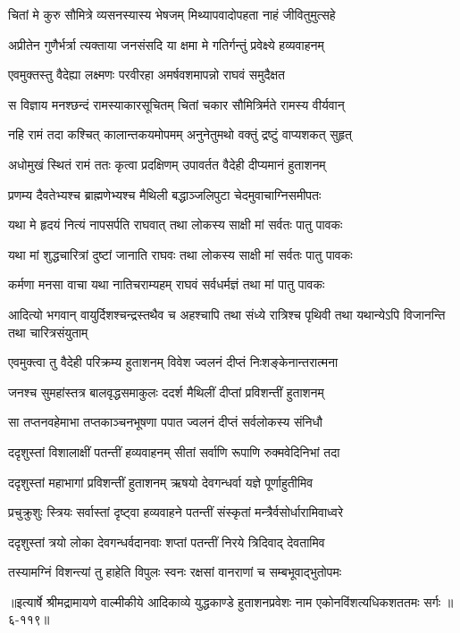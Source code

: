 \twolineshloka
{चितां मे कुरु सौमित्रे व्यसनस्यास्य भेषजम्}
{मिथ्यापवादोपहता नाहं जीवितुमुत्सहे} %

\twolineshloka
{अप्रीतेन गुणैर्भर्त्रा त्यक्ताया जनसंसदि}
{या क्षमा मे गतिर्गन्तुं प्रवेक्ष्ये हव्यवाहनम्} %

\twolineshloka
{एवमुक्तस्तु वैदेह्या लक्ष्मणः परवीरहा}
{अमर्षवशमापन्नो राघवं समुदैक्षत} %

\twolineshloka
{स विज्ञाय मनश्छन्दं रामस्याकारसूचितम्}
{चितां चकार सौमित्रिर्मते रामस्य वीर्यवान्} %

\twolineshloka
{नहि रामं तदा कश्चित् कालान्तकयमोपमम्}
{अनुनेतुमथो वक्तुं द्रष्टुं वाप्यशकत् सुहृत्} %

\twolineshloka
{अधोमुखं स्थितं रामं ततः कृत्वा प्रदक्षिणम्}
{उपावर्तत वैदेही दीप्यमानं हुताशनम्} %

\twolineshloka
{प्रणम्य दैवतेभ्यश्च ब्राह्मणेभ्यश्च मैथिली}
{बद्धाञ्जलिपुटा चेदमुवाचाग्निसमीपतः} %

\twolineshloka
{यथा मे हृदयं नित्यं नापसर्पति राघवात्}
{तथा लोकस्य साक्षी मां सर्वतः पातु पावकः} %

\twolineshloka
{यथा मां शुद्धचारित्रां दुष्टां जानाति राघवः}
{तथा लोकस्य साक्षी मां सर्वतः पातु पावकः} %

\twolineshloka
{कर्मणा मनसा वाचा यथा नातिचराम्यहम्}
{राघवं सर्वधर्मज्ञं तथा मां पातु पावकः} %

\threelineshloka
{आदित्यो भगवान् वायुर्दिशश्चन्द्रस्तथैव च}
{अहश्चापि तथा संध्ये रात्रिश्च पृथिवी तथा}
{यथान्येऽपि विजानन्ति तथा चारित्रसंयुताम्} %

\twolineshloka
{एवमुक्त्वा तु वैदेही परिक्रम्य हुताशनम्}
{विवेश ज्वलनं दीप्तं निःशङ्केनान्तरात्मना} %

\twolineshloka
{जनश्च सुमहांस्तत्र बालवृद्धसमाकुलः}
{ददर्श मैथिलीं दीप्तां प्रविशन्तीं हुताशनम्} %

\twolineshloka
{सा तप्तनवहेमाभा तप्तकाञ्चनभूषणा}
{पपात ज्वलनं दीप्तं सर्वलोकस्य संनिधौ} %

\twolineshloka
{ददृशुस्तां विशालाक्षीं पतन्तीं हव्यवाहनम्}
{सीतां सर्वाणि रूपाणि रुक्मवेदिनिभां तदा} %

\twolineshloka
{ददृशुस्तां महाभागां प्रविशन्तीं हुताशनम्}
{ऋषयो देवगन्धर्वा यज्ञे पूर्णाहुतीमिव} %

\twolineshloka
{प्रचुक्रुशुः स्त्रियः सर्वास्तां दृष्ट्वा हव्यवाहने}
{पतन्तीं संस्कृतां मन्त्रैर्वसोर्धारामिवाध्वरे} %

\twolineshloka
{ददृशुस्तां त्रयो लोका देवगन्धर्वदानवाः}
{शप्तां पतन्तीं निरये त्रिदिवाद् देवतामिव} %

\twolineshloka
{तस्यामग्निं विशन्त्यां तु हाहेति विपुलः स्वनः}
{रक्षसां वानराणां च सम्बभूवाद्भुतोपमः} %


॥इत्यार्षे श्रीमद्रामायणे वाल्मीकीये आदिकाव्ये युद्धकाण्डे हुताशनप्रवेशः नाम एकोनविंशत्यधिकशततमः सर्गः ॥६-११९॥
